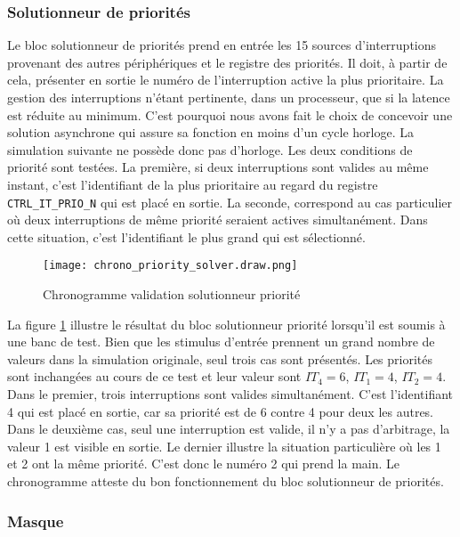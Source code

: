 \subsubsection{Solutionneur de priorités}
Le bloc solutionneur de priorités prend en entrée les 15 sources d'interruptions provenant des autres périphériques et le registre des priorités.
Il doit, à partir de cela, présenter en sortie le numéro de l'interruption active la plus prioritaire.
La gestion des interruptions n'étant pertinente, dans un processeur, que si la latence est réduite au minimum.
C'est pourquoi nous avons fait le choix de concevoir une solution asynchrone qui assure sa fonction en moins d'un cycle horloge.
La simulation suivante ne possède donc pas d'horloge.
Les deux conditions de priorité sont testées.
La première, si deux interruptions sont valides au même instant, c'est l'identifiant de la plus prioritaire au regard du registre \texttt{CTRL\_IT\_PRIO\_N} qui est placé en sortie.
La seconde, correspond au cas particulier où deux interruptions de même priorité seraient actives simultanément.
Dans cette situation, c'est l'identifiant le plus grand qui est sélectionné.
\begin{figure}[H]
    \centering
    \texttt{[image: chrono\_priority\_solver.draw.png]}
    \caption{Chronogramme validation solutionneur priorité}
    \label{fig:chrono_prio_solv}
\end{figure}
La figure \ref{fig:chrono_prio_solv} illustre le résultat du bloc solutionneur priorité lorsqu'il est soumis à une banc de test.
Bien que les stimulus d'entrée prennent un grand nombre de valeurs dans la simulation originale, seul trois cas sont présentés.
Les priorités sont inchangées au cours de ce test et leur valeur sont $IT_4=6$, $IT_1=4$, $IT_2=4$.
Dans le premier, trois interruptions sont valides simultanément.
C'est l'identifiant 4 qui est placé en sortie, car sa priorité est de 6 contre 4 pour deux les autres.
Dans le deuxième cas, seul une interruption est valide, il n'y a pas d'arbitrage, la valeur 1 est visible en sortie.
Le dernier illustre la situation particulière où les 1 et 2 ont la même priorité.
C'est donc le numéro 2 qui prend la main.
Le chronogramme atteste du bon fonctionnement du bloc solutionneur de priorités.


\subsubsection{Masque}

